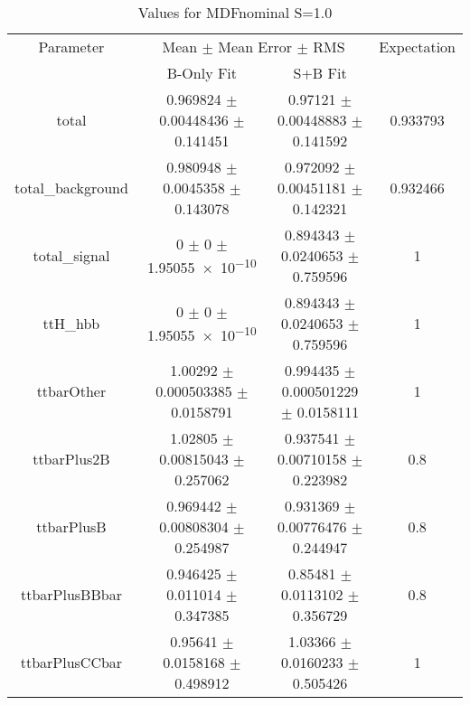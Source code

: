 \begin{table}
\centering
\caption{Values for MDFnominal S=1.0}
\begin{tabular}{cccc}
\toprule
Parameter & \multicolumn{2}{c}{Mean $\pm$ Mean Error $\pm$ RMS} & Expectation\\
 & B-Only Fit & S+B Fit & \\
\midrule
total & \num{0.969824} $\pm$ \num{0.00448436} $\pm$ \num{0.141451} & \num{0.97121} $\pm$ \num{0.00448883} $\pm$ \num{0.141592} & \num{0.933793}\\
total\_background & \num{0.980948} $\pm$ \num{0.0045358} $\pm$ \num{0.143078} & \num{0.972092} $\pm$ \num{0.00451181} $\pm$ \num{0.142321} & \num{0.932466}\\
total\_signal & \num{0} $\pm$ \num{0} $\pm$ \num{1.95055e-10} & \num{0.894343} $\pm$ \num{0.0240653} $\pm$ \num{0.759596} & \num{1}\\
ttH\_hbb & \num{0} $\pm$ \num{0} $\pm$ \num{1.95055e-10} & \num{0.894343} $\pm$ \num{0.0240653} $\pm$ \num{0.759596} & \num{1}\\
ttbarOther & \num{1.00292} $\pm$ \num{0.000503385} $\pm$ \num{0.0158791} & \num{0.994435} $\pm$ \num{0.000501229} $\pm$ \num{0.0158111} & \num{1}\\
ttbarPlus2B & \num{1.02805} $\pm$ \num{0.00815043} $\pm$ \num{0.257062} & \num{0.937541} $\pm$ \num{0.00710158} $\pm$ \num{0.223982} & \num{0.8}\\
ttbarPlusB & \num{0.969442} $\pm$ \num{0.00808304} $\pm$ \num{0.254987} & \num{0.931369} $\pm$ \num{0.00776476} $\pm$ \num{0.244947} & \num{0.8}\\
ttbarPlusBBbar & \num{0.946425} $\pm$ \num{0.011014} $\pm$ \num{0.347385} & \num{0.85481} $\pm$ \num{0.0113102} $\pm$ \num{0.356729} & \num{0.8}\\
ttbarPlusCCbar & \num{0.95641} $\pm$ \num{0.0158168} $\pm$ \num{0.498912} & \num{1.03366} $\pm$ \num{0.0160233} $\pm$ \num{0.505426} & \num{1}\\
\bottomrule
\end{tabular}
\end{table}